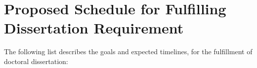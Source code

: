 %
%



\section{Proposed Schedule for Fulfilling Dissertation Requirement}

The following list describes the goals and expected timelines,
for the fulfillment of doctoral dissertation:

